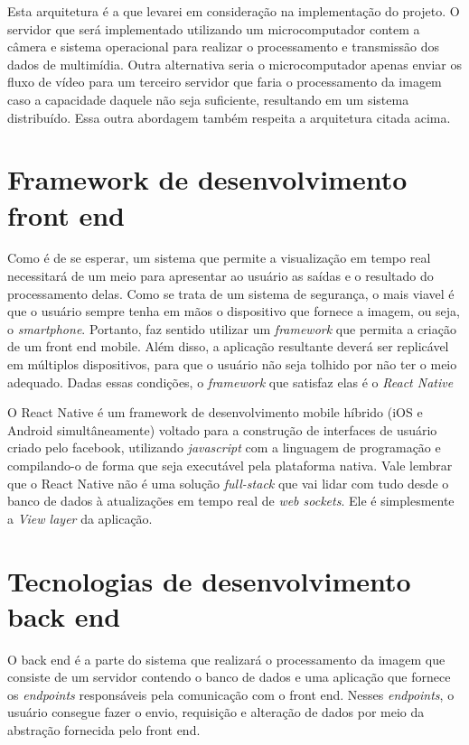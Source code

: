 \documentclass[12pt, %
openright, 
oneside, %
a4paper,    %
brazil]{facom-ufu-abntex2}
\begin{document}
Esta arquitetura é a que levarei em consideração na implementação do projeto. O servidor que será implementado utilizando
um microcomputador contem a câmera e sistema operacional para realizar o processamento e transmissão dos dados de 
multimídia. Outra alternativa seria o microcomputador apenas enviar os fluxo de vídeo para um terceiro servidor que faria o processamento
da imagem caso a capacidade daquele não seja suficiente, resultando em um sistema distribuído. Essa outra abordagem também
respeita a arquitetura citada acima.



\section{Framework de desenvolvimento front end}

Como é de se esperar, um sistema que permite a visualização em tempo real necessitará
de um meio para apresentar ao usuário as saídas e o resultado do processamento delas.
Como se trata de um sistema de segurança, o mais viavel é que o usuário sempre tenha 
em mãos o dispositivo que fornece a imagem, ou seja, o \emph{smartphone}. Portanto, faz sentido utilizar um \emph{framework}
que permita a criação de um front end mobile. Além disso, a aplicação resultante
deverá ser replicável em múltiplos dispositivos, para que o usuário não seja tolhido por não ter o meio adequado.
Dadas essas condições, o \emph{framework} que satisfaz elas é o \emph{React Native}

O React Native é um framework de desenvolvimento mobile híbrido (iOS e Android simultâneamente) voltado para a construção de interfaces
de usuário criado 
pelo facebook, utilizando \emph{javascript} com a linguagem de programação e compilando-o de forma que
seja executável pela plataforma nativa. Vale lembrar que o React Native não é 
uma solução \emph{full-stack} que vai lidar com tudo desde o banco de dados à atualizações em tempo real
de \emph{web sockets}. Ele é simplesmente a \emph{View layer} da aplicação. \cite{boduch2017react}


\section{Tecnologias de desenvolvimento back end}

O back end é a parte do sistema que realizará o processamento da imagem
que consiste de um servidor contendo o
banco de dados e uma aplicação que fornece os \emph{endpoints} responsáveis pela comunicação
com o front end. Nesses \emph{endpoints}, o usuário consegue fazer o envio, requisição e alteração
de dados por meio da abstração fornecida pelo front end. 
\end{document}
